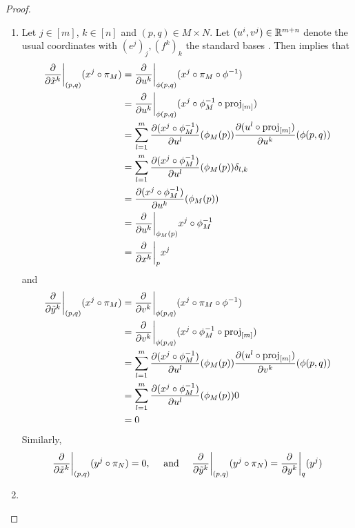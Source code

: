 \documentclass{book}
\begin{document}
	
	\begin{proof}\
		\begin{enumerate}
			\item Let $j \in [m]$, $k \in [n]$ and $(p,q) \in M \times N$. Let $(u^i,v^j) \in \mathbb{R}^{m+n}$ denote the usual coordinates with $(e^j)_j, (f^k)_k$ the standard bases . Then  implies that
			\begin{align*}
				\frac{\partial }{\partial \tilde{x}^k} \bigg|_{(p,q)} ( x^j \circ \pi_M )
				& = \frac{\partial }{\partial u^k} \bigg|_{\phi(p,q)} (x^j \circ \pi_M \circ \phi^{-1}) \\
				& = \frac{\partial }{\partial u^k} \bigg|_{\phi(p,q)} (x^j \circ \phi_M^{-1} \circ \operatorname{\text{proj}}_{[m]}) \\
				& = \sum_{l=1}^m \frac{\partial (x^j \circ \phi_M^{-1})}{\partial u^l}(\phi_M(p)) \frac{\partial (u^l \circ \operatorname{\text{proj}}_{[m]})}{\partial u^k}(\phi(p,q)) \\ 
				& = \sum_{l=1}^m \frac{\partial (x^j \circ \phi_M^{-1})}{\partial u^l}(\phi_M(p)) \delta_{l,k} \\ 
				& = \frac{\partial (x^j \circ \phi_M^{-1})}{\partial u^k}(\phi_M(p)) \\
				& = \frac{\partial }{\partial u^k} \bigg|_{\phi_M(p)} x^j \circ \phi_M^{-1} \\
				& = \frac{\partial }{\partial x^k} \bigg|_{p} x^j
			\end{align*}
			and 
			\begin{align*}
				\frac{\partial }{\partial \tilde{y}^k} \bigg|_{(p,q)} ( x^j \circ \pi_M )
				& = \frac{\partial }{\partial v^k} \bigg|_{\phi(p,q)} (x^j \circ \pi_M \circ \phi^{-1}) \\
				& = \frac{\partial }{\partial v^k} \bigg|_{\phi(p,q)} (x^j \circ \phi_M^{-1} \circ \operatorname{\text{proj}}_{[m]}) \\
				& = \sum_{l=1}^m \frac{\partial (x^j \circ \phi_M^{-1})}{\partial u^l}(\phi_M(p)) \frac{\partial (u^l \circ \operatorname{\text{proj}}_{[m]})}{\partial v^k}(\phi(p,q)) \\ 
				& = \sum_{l=1}^m \frac{\partial (x^j \circ \phi_M^{-1})}{\partial u^l}(\phi_M(p)) 0 \\ 
				& = 0
			\end{align*}
			Similarly, 
			$$\frac{\partial }{\partial \tilde{x}^k} \bigg|_{(p,q)} ( y^j \circ \pi_N ) = 0, \quad \text{ and } \quad  \frac{\partial }{\partial \tilde{y}^k} \bigg|_{(p,q)} ( y^j \circ \pi_N ) =  \frac{\partial}{\partial y^k} \bigg|_q (y^j)$$
			\item \tcr{FINISH!!!}
		\end{enumerate}
		
	\end{proof}
\end{document}
